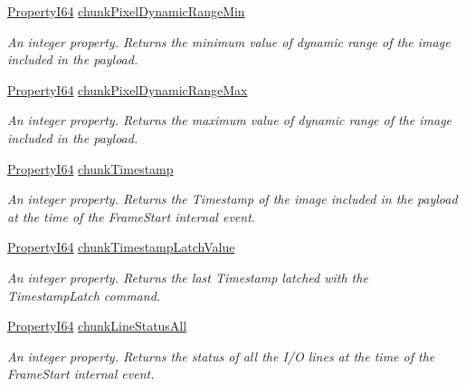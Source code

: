 \begin{DoxyCompactItemize}
\hyperlink{group___common_interface_ga81749b2696755513663492664a18a893}{Property\+I64} \hyperlink{classmv_i_m_p_a_c_t_1_1acquire_1_1_gen_i_cam_1_1_chunk_data_control_a5a9b1a979bd09b5a47ad56f5b178cb38}{chunk\+Pixel\+Dynamic\+Range\+Min}
\begin{DoxyCompactList}\small\item\em An integer property. Returns the minimum value of dynamic range of the image included in the payload. \end{DoxyCompactList}\item 
\hyperlink{group___common_interface_ga81749b2696755513663492664a18a893}{Property\+I64} \hyperlink{classmv_i_m_p_a_c_t_1_1acquire_1_1_gen_i_cam_1_1_chunk_data_control_a64e63b9d3a7ec7e2a8011df6e4893f48}{chunk\+Pixel\+Dynamic\+Range\+Max}
\begin{DoxyCompactList}\small\item\em An integer property. Returns the maximum value of dynamic range of the image included in the payload. \end{DoxyCompactList}\item 
\hyperlink{group___common_interface_ga81749b2696755513663492664a18a893}{Property\+I64} \hyperlink{classmv_i_m_p_a_c_t_1_1acquire_1_1_gen_i_cam_1_1_chunk_data_control_a6524fff11f2289aecb48e49f15a28710}{chunk\+Timestamp}
\begin{DoxyCompactList}\small\item\em An integer property. Returns the Timestamp of the image included in the payload at the time of the Frame\+Start internal event. \end{DoxyCompactList}\item 
\hyperlink{group___common_interface_ga81749b2696755513663492664a18a893}{Property\+I64} \hyperlink{classmv_i_m_p_a_c_t_1_1acquire_1_1_gen_i_cam_1_1_chunk_data_control_aaaa113e713066193edd3549f5a6c0ab5}{chunk\+Timestamp\+Latch\+Value}
\begin{DoxyCompactList}\small\item\em An integer property. Returns the last Timestamp latched with the Timestamp\+Latch command. \end{DoxyCompactList}\item 
\hyperlink{group___common_interface_ga81749b2696755513663492664a18a893}{Property\+I64} \hyperlink{classmv_i_m_p_a_c_t_1_1acquire_1_1_gen_i_cam_1_1_chunk_data_control_aefb276829f054332349de8fa7eb5125f}{chunk\+Line\+Status\+All}
\begin{DoxyCompactList}\small\item\em An integer property. Returns the status of all the I/\+O lines at the time of the Frame\+Start internal event. \end{DoxyCompactList}\item 

\end{DoxyCompactItemize}
